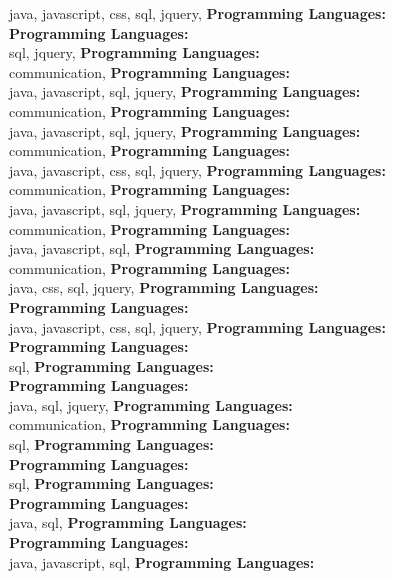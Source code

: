 java, javascript, css, sql, jquery, \textbf{Programming Languages:} \\
\textbf{Programming Languages:} \\
sql, jquery, \textbf{Programming Languages:} \\
communication, \textbf{Programming Languages:} \\
java, javascript, sql, jquery, \textbf{Programming Languages:} \\
communication, \textbf{Programming Languages:} \\
java, javascript, sql, jquery, \textbf{Programming Languages:} \\
communication, \textbf{Programming Languages:} \\
java, javascript, css, sql, jquery, \textbf{Programming Languages:} \\
communication, \textbf{Programming Languages:} \\
java, javascript, sql, jquery, \textbf{Programming Languages:} \\
communication, \textbf{Programming Languages:} \\
java, javascript, sql, \textbf{Programming Languages:} \\
communication, \textbf{Programming Languages:} \\
java, css, sql, jquery, \textbf{Programming Languages:} \\
\textbf{Programming Languages:} \\
java, javascript, css, sql, jquery, \textbf{Programming Languages:} \\
\textbf{Programming Languages:} \\
sql, \textbf{Programming Languages:} \\
\textbf{Programming Languages:} \\
java, sql, jquery, \textbf{Programming Languages:} \\
communication, \textbf{Programming Languages:} \\
sql, \textbf{Programming Languages:} \\
\textbf{Programming Languages:} \\
sql, \textbf{Programming Languages:} \\
\textbf{Programming Languages:} \\
java, sql, \textbf{Programming Languages:} \\
\textbf{Programming Languages:} \\
java, javascript, sql, \textbf{Programming Languages:} \\
